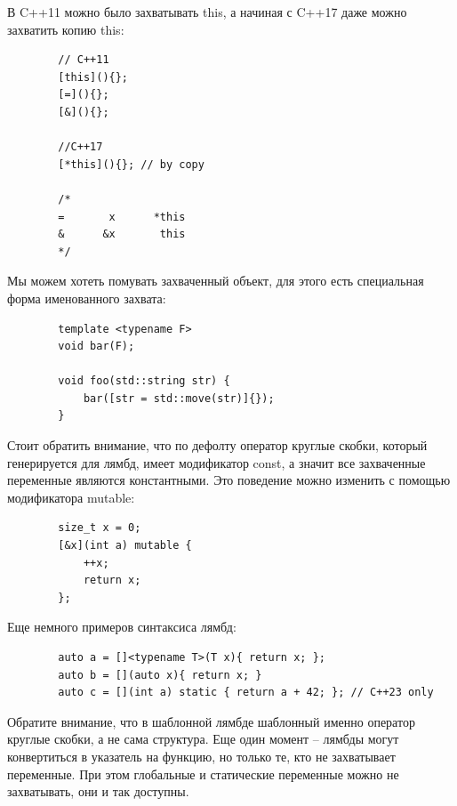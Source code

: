 \documentclass[12pt, a4paper]{article}
\begin{document}
	В C++11 можно было захватывать this, а начиная с C++17 даже можно захватить копию this:
	\begin{verbatim}
		// C++11
		[this](){};
		[=](){};
		[&](){};
		
		//C++17
		[*this](){}; // by copy
		
		/*
		=       x      *this
		&      &x       this
		*/
	\end{verbatim}
	Мы можем хотеть помувать захваченный объект, для этого есть специальная форма именованного захвата:
	\begin{verbatim}
		template <typename F>
		void bar(F);
		
		void foo(std::string str) {
			bar([str = std::move(str)]{});
		}
	\end{verbatim}
	Стоит обратить внимание, что по дефолту оператор круглые скобки, который генерируется для лямбд, имеет модификатор const, а значит все захваченные переменные являются константными. Это поведение можно изменить с помощью модификатора mutable:
	\begin{verbatim}
		size_t x = 0;
		[&x](int a) mutable {
			++x;
			return x;
		};
	\end{verbatim}
	Еще немного примеров синтаксиса лямбд:
	\begin{verbatim}
		auto a = []<typename T>(T x){ return x; };
		auto b = [](auto x){ return x; }
		auto c = [](int a) static { return a + 42; }; // C++23 only
	\end{verbatim}
	Обратите внимание, что в шаблонной лямбде шаблонный именно оператор круглые скобки, а не сама структура. Еще один момент -- лямбды могут конвертиться в указатель на функцию, но только те, кто не захватывает переменные. При этом глобальные и статические переменные можно не захватывать, они и так доступны. 
\end{document}
